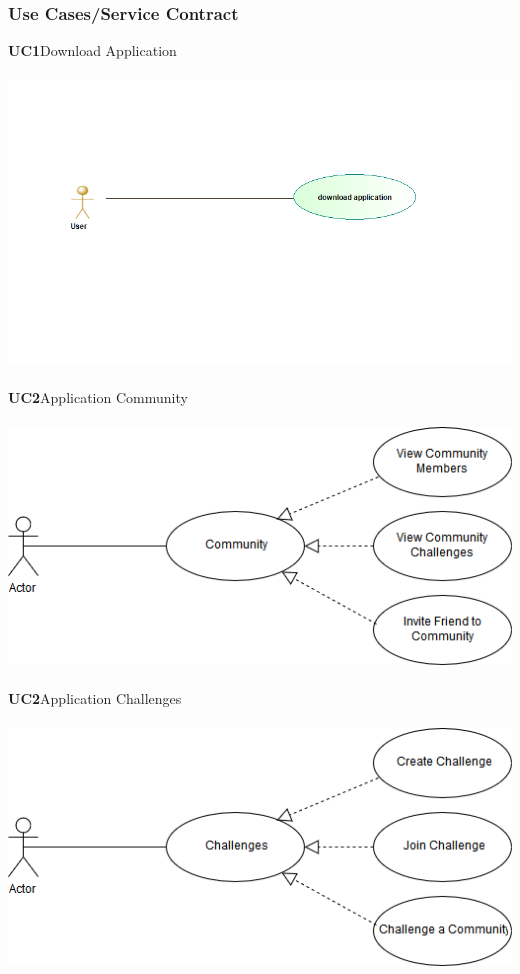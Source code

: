 \documentclass[11pt]{article}
\begin{document}
\subsubsection{Use Cases/Service Contract}
\textbf{UC1}Download Application\\\\
\includegraphics[scale=0.5]{./DiagramsTshepo/downloadApp.png}\\\\
\textbf{UC2}Application Community\\\\
\includegraphics[scale=0.5]{./DiagramsAzhar/Community1.png}\\\\
\textbf{UC2}Application Challenges\\\\
\includegraphics[scale=0.5]{./DiagramsAzhar/Community2.png}\\\\
\end{document}
